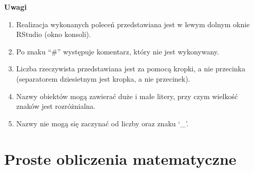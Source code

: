 \documentclass[12pt,B5paper,]{book}
\providecommand{\tightlist}{%
  \setlength{\itemsep}{0pt}\setlength{\parskip}{0pt}}
\begin{document}
\textbf{Uwagi}

\begin{enumerate}
\def\labelenumi{\arabic{enumi}.}
\tightlist
\item
  Realizacja wykonanych poleceń przedstawiana jest w lewym dolnym oknie
  RStudio (okno konsoli).
\item
  Po znaku ``\#'' występuje komentarz, który nie jest wykonywany.
\item
  Liczba rzeczywista przedstawiana jest za pomocą kropki, a nie
  przecinka (separatorem dziesietnym jest kropka, a nie przecinek).
\item
  Nazwy obiektów mogą zawierać duże i małe litery, przy czym wielkość
  znaków jest rozróżnialna.
\item
  Nazwy nie mogą się zaczynać od liczby oraz znaku `\_'.
\end{enumerate}

\section{Proste obliczenia
matematyczne}\label{proste-obliczenia-matematyczne}
\end{document}
